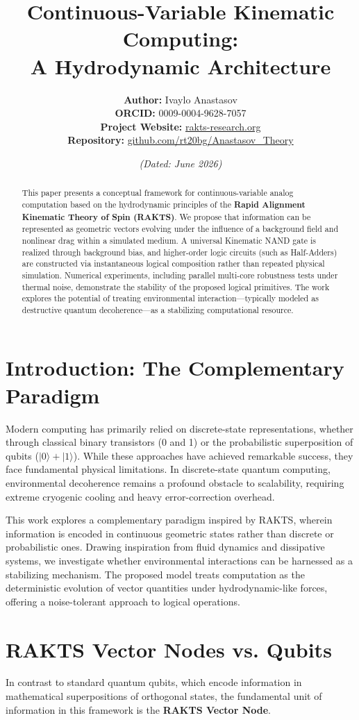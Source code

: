 \documentclass[12pt]{article}
\title{\textbf{Continuous-Variable Kinematic Computing: \\ A Hydrodynamic Architecture}}
\author{\textbf{Author:} Ivaylo Anastasov \\
\textbf{ORCID:} 0009-0004-9628-7057 \\
\textbf{Project Website:} \href{https://rakts-research.org}{rakts-research.org} \\
\textbf{Repository:} \href{https://github.com/rt20bg/Anastasov_Theory}{github.com/rt20bg/Anastasov\_Theory}}
\date{\textit{(Dated: June 2026)}}
\begin{document}
\maketitle

\begin{abstract}
This paper presents a conceptual framework for continuous-variable analog computation based on the hydrodynamic principles of the \textbf{Rapid Alignment Kinematic Theory of Spin (RAKTS)}. We propose that information can be represented as geometric vectors evolving under the influence of a background field and nonlinear drag within a simulated medium. A universal Kinematic NAND gate is realized through background bias, and higher-order logic circuits (such as Half-Adders) are constructed via instantaneous logical composition rather than repeated physical simulation. Numerical experiments, including parallel multi-core robustness tests under thermal noise, demonstrate the stability of the proposed logical primitives. The work explores the potential of treating environmental interaction---typically modeled as destructive quantum decoherence---as a stabilizing computational resource.
\end{abstract}

\section{Introduction: The Complementary Paradigm}
Modern computing has primarily relied on discrete-state representations, whether through classical binary transistors (0 and 1) or the probabilistic superposition of qubits ($|0\rangle + |1\rangle$). While these approaches have achieved remarkable success, they face fundamental physical limitations. In discrete-state quantum computing, environmental decoherence remains a profound obstacle to scalability, requiring extreme cryogenic cooling and heavy error-correction overhead.

This work explores a complementary paradigm inspired by RAKTS, wherein information is encoded in continuous geometric states rather than discrete or probabilistic ones. Drawing inspiration from fluid dynamics and dissipative systems, we investigate whether environmental interactions can be harnessed as a stabilizing mechanism. The proposed model treats computation as the deterministic evolution of vector quantities under hydrodynamic-like forces, offering a noise-tolerant approach to logical operations.

\section{RAKTS Vector Nodes vs. Qubits}
In contrast to standard quantum qubits, which encode information in mathematical superpositions of orthogonal states, the fundamental unit of information in this framework is the \textbf{RAKTS Vector Node}.
\end{document}
